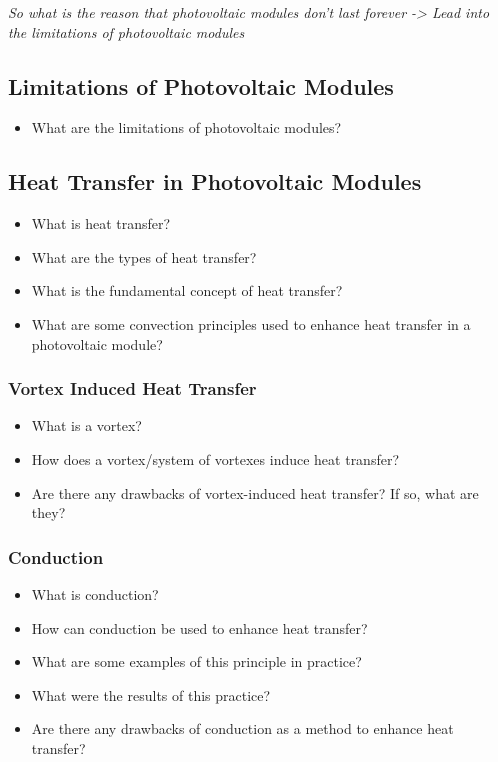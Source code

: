 \noindent \textit{So what is the reason that photovoltaic modules don't last forever -> Lead into the limitations of photovoltaic modules}






\subsection{Limitations of Photovoltaic Modules}
\begin{itemize}
    \item What are the limitations of photovoltaic modules?
\end{itemize}

\subsection{Heat Transfer in Photovoltaic Modules}
\begin{itemize}
    \item What is heat transfer?
    \item What are the types of heat transfer?
    \item What is the fundamental concept of heat transfer?
    \item What are some convection principles used to enhance heat transfer in a photovoltaic module?
\end{itemize}

\subsubsection{Vortex Induced Heat Transfer}
\begin{itemize}
    \item What is a vortex?
    \item How does a vortex/system of vortexes induce heat transfer?
    \item Are there any drawbacks of vortex-induced heat transfer? If so, what are they?
\end{itemize}

\subsubsection{Conduction}
\begin{itemize}
    \item What is conduction?
    \item How can conduction be used to enhance heat transfer?
    \item What are some examples of this principle in practice?
    \item What were the results of this practice?
    \item Are there any drawbacks of conduction as a method to enhance heat transfer?
\end{itemize}

